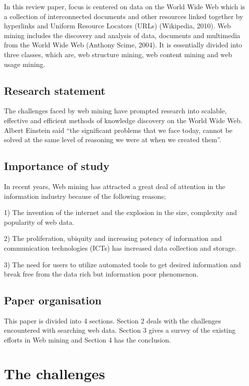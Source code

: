 \documentclass{article}
\begin{document}
In this review paper, focus is centered on data on the World Wide Web which is a collection of interconnected documents and other resources linked together by hyperlinks and Uniform Resource Locators (URLs) (Wikipedia, 2010).
 Web mining includes the discovery and analysis of data, documents and multimedia from the World Wide Web (Anthony Scime, 2004). It is essentially divided into three classes, which are, web structure mining, web content mining and web usage mining.

\subsection{Research statement}

The challenges faced by web mining have prompted research into scalable, effective and efficient methods of knowledge discovery on the World Wide Web. Albert Einstein said “the significant problems that we face today, cannot be solved at the same level of reasoning we were at when we created them”.
\subsection{Importance of study}
In recent years, Web mining has attracted a great deal of attention in the information industry because of the following reasons;

1)	The invention of the internet and the explosion in the size, complexity and popularity of web data.

2)	The proliferation, ubiquity and increasing potency of information and communication technologies (ICTs) has increased data collection and storage.

3)	The need for users to utilize automated tools to get desired information and break free from the  data rich but information poor phenomenon.


\subsection{Paper organisation}

This paper is divided into 4 sections. Section 2 deals with the challenges encountered with searching web data. Section 3 gives a survey of the existing efforts in Web mining and Section 4 has the conclusion.

\section{The challenges}
\end{document}
